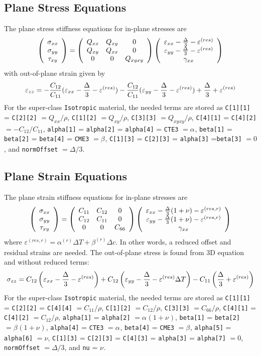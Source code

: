 \documentclass[11pt]{book}
\def\a#1{\alpha_{#1}}
\def\b#1{\beta_{#1}}
\def\code#1{{\small\tt #1}}
\def\DT{\Delta T}
\def\e#1{\varepsilon_{#1}}
\def\er#1{\varepsilon_{#1}^{(res)}}
\def\err#1{\varepsilon_{#1}^{(res,r)}}
\def\g#1{\gamma_{#1}}
\def\s#1{\sigma_{#1}}
\def\symmat#1#2#3#4#5#6{\left(\begin{array}{ccc} #1 & #2 & #3 \\ #2 & #4 & #5 \\
                                                      #3 & #5 & #6 \end{array}\right)}
\def\t#1{\tau_{#1}}
\def\v#1{\nu_{#1}}
\def\vvec#1#2#3{\left(\begin{array}{ccc} #1 \\ #2 \\ #3 \end{array}\right)}
\begin{document}
\subsection{Plane Stress Equations}

The plane stress stiffness equations for in-plane stresses are
\begin{equation}
      \vvec{\s{xx}}{\s{yy}}{\t{xy}} = \symmat{Q_{xx}}{Q_{xy}}{0}{Q_{xx}}{0}{Q_{xyxy}}
          \vvec{\e{xx}- {\Delta\over 3}  - \er{}}{\e{yy}- {\Delta\over 3}  - \er{}}{\g{xx}}
 \end{equation}
with out-of-plane strain given  by
\begin{equation}
            \e{zz} = -{C_{12}\over C_{11}}(\e{xx}- {\Delta\over 3} -\er{}) - {C_{12}\over C_{11}}(\e{yy} - {\Delta\over 3}-\er{}) 
                   + {\Delta\over 3}  + \er{}
\end{equation}
For the super-class \code{Isotropic} material, the needed terms are stored as \code{C[1][1]} = \code{C[2][2]} $= Q_{xx}/\rho$,  \code{C[1][2]} $= Q_{xy}/\rho$,  \code{C[3][3]} $= Q_{xyxy}/\rho$,  \code{C[4][1]} =  \code{C[4][2]}$= -C_{12}/C_{11}$,  \code{alpha[1]} = \code{alpha[2]} = \code{alpha[4]} = \code{CTE3}  $=\a{}$, \code{beta[1]} = \code{beta[2]} = \code{beta[4]} = \code{CME3}  $=\b{}$, \code{C[1][3]} = \code{C[2][3]} = \code{alpha[3]} =\code{beta[3]} $=0$, and \code{normOffset} $=\Delta/3$.

\subsection{Plane Strain Equations}

The plane strain stiffness equations for in-plane stresses are
\begin{equation}
      \vvec{\s{xx}}{\s{yy}}{\t{xy}} = \symmat{C_{11}}{C_{12}}{0}{C_{11}}{0}{C_{66}}
          \vvec{\e{xx} - {\Delta\over 3}(1+\nu) - \err{}}{\e{yy} - {\Delta\over 3}(1+\nu)  - \err{}}{\g{xx}}
 \end{equation}
 where $\err{}=\a{}^{(r)}\DT+\b{}^{(r)}\Delta c$.
 In other words, a reduced offset and residual strains are needed. The out-of-plane stress is found from 3D equation and without reduced terms:
 \begin{equation}
            \s{zz} = C_{12}\left(\e{xx} - {\Delta\over 3} -\er{}\right) 
                            +C_{12}\left(\e{yy} - {\Delta\over 3} -\er{}\DT\right) 
                            -C_{11}\left({\Delta\over 3} +\er{}\right) 
\end{equation}
For the super-class \code{Isotropic} material, the needed terms are stored as \code{C[1][1]} = \code{C[2][2]} = \code{C[4][4]} $= C_{11}/\rho$,  \code{C[1][2]} $= C_{12}/\rho$,  \code{C[3][3]} $= C_{66}/\rho$,  \code{C[4][1]} =  \code{C[4][2]} $= C_{12}/\rho$, \code{alpha[1]} = \code{alpha[2]} $=\a{}(1+\v{})$, \code{beta[1]} = \code{beta[2]} $=\b{}(1+\v{})$, \code{alpha[4]} = \code{CTE3} $=\a{}$, \code{beta[4]} = \code{CME3} $=\b{}$, \code{alpha[5]} = \code{alpha[6]} $=\nu$, \code{C[1][3]} = \code{C[2][3]} = \code{C[4][3]} = \code{alpha[3]} = \code{alpha[7]} $=0$, \code{normOffset} $=\Delta/3$, and \code{nu} = $\v{}$.
\end{document}
